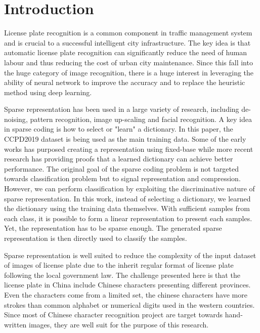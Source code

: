 
\section{Introduction}
License plate recognition is a common component in traffic management system
and is crucial to a successful intelligent city infrastructure. The key idea is 
that automatic license plate recognition can significantly reduce the need of 
human labour and thus reducing the cost of urban city maintenance. Since this
fall into the huge category of image recognition, there is a huge interest 
in leveraging the ability of neural network to improve the accuracy and to 
replace the heuristic method using deep learning.

Sparse representation has been used in a large variety of research, including
de-noising\cite{4011956}, pattern recognition\cite{CGV-058}, image up-scaling\cite{SparesuperResolution}
and facial recognition\cite{SparseFace}. A key idea in sparse coding is how to select
or "learn" a dictionary. In this paper, the CCPD2019\cite{xu2018towards} 
dataset is being used as the main training data. Some of the early works has purposed
creating a representation using fixed-base\cite{5452966} while more recent research
has providing proofs that a learned dictionary can achieve better performance\cite{4011956}.
The original goal of the sparse coding problem is not targeted towards classification problem but
to signal representation and compression. However, we can perform classification 
by exploiting the discriminative nature of sparse representation. In this work, instead of selecting
a dictionary, we learned the dictionary using the training data themselves. With sufficient samples
from each class, it is possible to form a linear representation to present each samples. Yet,
the representation has to be sparse enough. The generated sparse representation is then directly
used to classify the samples. 

Sparse representation is well suited to reduce the complexity of the input dataset of 
images of license plate due to the inherit regular format of license 
plate following the local government law. The challenge presented here is that 
the license plate in China include Chinese characters presenting different provinces.
Even the characters come from a limited set, the chinese characters have more strokes
than common alphabet or numerical digits used in the western countries. Since most of
Chinese character recognition project are target towards hand-written images, they are
well suit for the purpose of this research.

